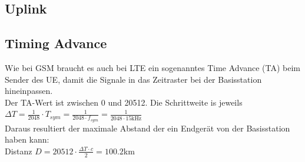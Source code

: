 \subsection{Uplink}

\subsection{Timing Advance}
	Wie bei GSM braucht es auch bei LTE ein sogenanntes Time Advance (TA) beim Sender des UE, damit die Signale
	in das Zeitraster bei der Basisstation hineinpassen. \\
	Der TA-Wert ist zwischen 0 und 20512. Die Schrittweite is jeweils 
	$\Delta T = \frac{1}{2048}\cdot T_{sym} = \frac{1}{2048\cdot f_{sym}} = \frac{1}{2048\cdot 15\text{kHz}}$ \\
	
	Daraus resultiert der maximale Abstand der ein Endgerät von der Basisstation haben kann: \\
	Distanz $D = 20512\cdot \frac{\Delta T \cdot c}{2} = 100.2$km 
	
	
